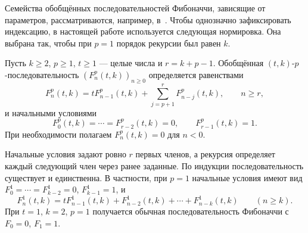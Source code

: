 Семейства обобщённых последовательностей Фибоначчи, зависящие
от параметров, рассматриваются, например, в~\cite{Mehraban2006Gulliver}.
Чтобы однозначно зафиксировать индексацию, в настоящей работе
используется следующая нормировка. Она выбрана так, чтобы при $p=1$
порядок рекурсии был равен $k$.

\begin{definition}\label{defn1pil}
Пусть $k\ge2$, $p\ge1$, $t\ge1$ --- целые числа и $r=k+p-1$.
Обобщённая $(t,k)$-$p$-последовательность
$(F_n^p(t,k))_{n\ge0}$ определяется равенствами
\begin{equation}
 F_n^p(t,k)=tF_{n-1}^p(t,k)
       +\sum_{j=p+1}^{r}F_{n-j}^p(t,k),
 \qquad n\ge r,
\end{equation}
и начальными условиями
\begin{equation}
 F_0^p(t,k)=\cdots=F_{r-2}^p(t,k)=0,
 \qquad F_{r-1}^p(t,k)=1.
\end{equation}
При необходимости полагаем $F_n^p(t,k)=0$ для $n<0$.
\end{definition}

Начальные условия задают ровно $r$ первых членов, а рекурсия
определяет каждый следующий член через ранее заданные.
По индукции последовательность существует и единственна.
В частности, при $p=1$ начальные условия имеют вид
$F_0^1=\cdots=F_{k-2}^1=0$, $F_{k-1}^1=1$, и
\[
 F_n^1(t,k)=tF_{n-1}^1(t,k)+F_{n-2}^1(t,k)+\cdots+F_{n-k}^1(t,k)
 \qquad(n\ge k).
\]
При $t=1$, $k=2$, $p=1$ получается обычная последовательность
Фибоначчи с $F_0=0$, $F_1=1$.
